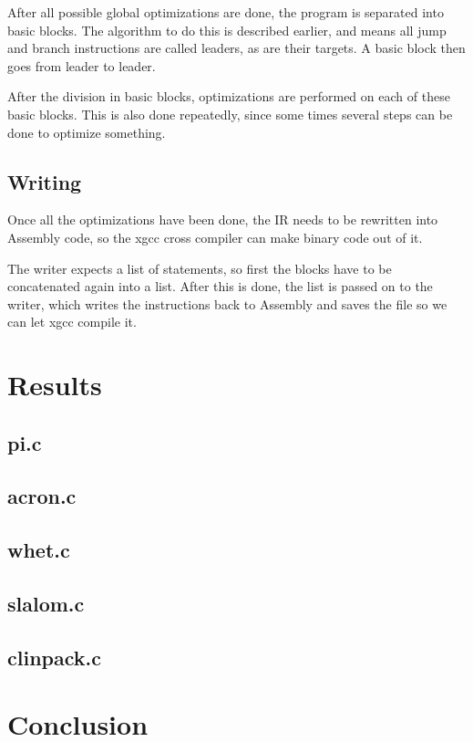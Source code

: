 \documentclass[10pt,a4paper]{article}
\begin{document}
After all possible global optimizations are done, the program is separated into
basic blocks. The algorithm to do this is described earlier, and means all
jump and branch instructions are called leaders, as are their targets. A basic
block then goes from leader to leader.

After the division in basic blocks, optimizations are performed on each of
these basic blocks. This is also done repeatedly, since some times several
steps can be done to optimize something.

\subsection{Writing}

Once all the optimizations have been done, the IR needs to be rewritten into
Assembly code, so the xgcc cross compiler can make binary code out of it.

The writer expects a list of statements, so first the blocks have to be
concatenated again into a list. After this is done, the list is passed on to
the writer, which writes the instructions back to Assembly and saves the file
so we can let xgcc compile it.

\section{Results}

\subsection{pi.c}

\subsection{acron.c}

\subsection{whet.c}

\subsection{slalom.c}

\subsection{clinpack.c}

\section{Conclusion}
\end{document}
